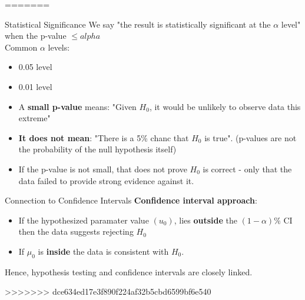 \documentclass[10pt]{extarticle}
\begin{document}
=======

\begin{conceptbox}{Statistical Significance}{}
    We say "the result is statistically significant at the $\alpha$ level" when the p-value $\leq alpha$ \\
    Common $\alpha$ levels:
    \begin{itemize}
        \item 0.05 level 
        \item 0.01 level
    \end{itemize}
\end{conceptbox}

\begin{conceptbox}{}{}
    \begin{itemize}
        \item A \textbf{small p-value} means: "Given $H_0$, it would be unlikely to observe data this extreme" 
        \item \textbf{It does not mean}: "There is a 5\% chanc that $H_0$ is true". (p-values are not the probability of the null hypothesis itself)
        \item If the p-value is not small, that does not prove $H_0$ is correct - only that the data failed to provide strong evidence against it. 
    \end{itemize}
\end{conceptbox}

\begin{conceptbox}{Connection to Confidence Intervals}{}
    \textbf{Confidence interval approach}:
    \begin{itemize}
        \item  If the hypothesized paramater value $(u_0)$, lies \textbf{outside} the $(1-\alpha)\%$ CI then the data 
        suggests rejecting $H_0$
        \item If $\mu_0$ is \textbf{inside} the data is consistent with $H_0$. 
    \end{itemize}
    Hence, hypothesis testing and confidence intervals are closely linked.
\end{conceptbox}
>>>>>>> dce634ed17e3f890f224af32b5cbd6599bf6e540
\end{document}
